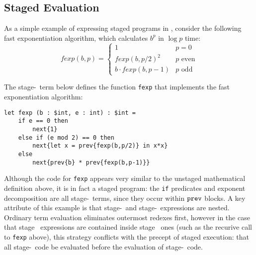 \subsection{Staged Evaluation}

As a simple example of expressing staged programs in \lang, consider the following fast exponentiation algorithm, which 
calculates $b^p$ in $\log p$ time:
\[
	\mathit{fexp}(b,p) = \left \{ \begin{array}{ll} 
		1 &  p = 0 \\ 
		\mathit{fexp}(b,p/2)^2 & p \text{ even} \\ 
		b \cdot \mathit{fexp}(b,p-1) & p \text{ odd} \end{array}
	\right .
\]

\noindent
The stage-\bbone\ term below defines the function {\tt fexp} that implements the fast exponentiation algorithm:%

\begin{lstlisting} 
let fexp (b : $int, e : int) : $int =
	if e == 0 then
		next{1}
	else if (e mod 2) == 0 then
		next{let x = prev{fexp(b,p/2)} in x*x}
	else
		next{prev{b} * prev{fexp(b,p-1)}}		
\end{lstlisting}

Although the code for {\tt fexp} appears very similar to the unstaged mathematical
definition above, it is in fact a staged program: the {\tt if} predicates and exponent
decomposition are all stage-\bbone\ terms, since they occur within ${\tt prev}$ blocks.
%
%
%
A key attribute of this example is that stage-\bbone\ and stage-\bbtwo\ expressions are nested. Ordinary term evaluation eliminates outermost redexes first, 
however in the case that stage \bbone\ expressions are contained inside
stage \bbtwo\ ones (such as the recurive call to {\tt fexp} above), this strategy conflicts with the precept of staged execution: that all stage-\bbone\ code be evaluated before the evaluation of stage-\bbtwo\ code. 

